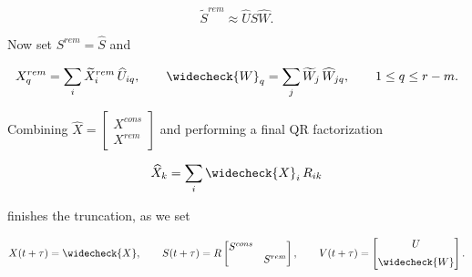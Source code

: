 \begin{equation}
    \widetilde{ S }^{rem} \approx \widehat{ U } \widehat{ S } \widehat{ W } . 
\end{equation}

Now set $S^{rem} = \widehat{ S }$ and 

\begin{equation}
    X^{rem}_q = \sum_i \widetilde{ X }^{rem}_i\, \widehat{ U }_{i q} , \quad\quad 
    \widecheck{ W }_q = \sum_j \widetilde{ W }_j\, \widehat{ W }_{j q} , 
    \quad\quad 1 \leq q \leq r - m . 
\end{equation}

Combining $\widehat{ X } = \begin{bmatrix} X^{cons} \\ X^{rem} \end{bmatrix}$ and 
performing a final QR factorization

\begin{equation}
    \widehat{ X }_k = \sum_i \widecheck{ X }_i\, R_{i k}
\end{equation}

finishes the truncation, as we set

\begin{equation}
    X (t + \tau) = \widecheck{ X }, \quad\quad 
    S (t + \tau) = R \begin{bmatrix}
        S^{cons} & \\
        & S^{rem}
    \end{bmatrix}, \quad\quad
    V (t + \tau) = \begin{bmatrix}
        U \\[0.5em] 
        \widecheck{ W }
    \end{bmatrix} . 
\end{equation}

